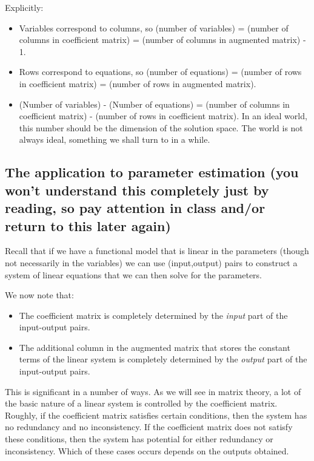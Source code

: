 \documentclass[10pt]{amsart}
\begin{document}
Explicitly:

\begin{itemize}
\item Variables correspond to columns, so (number of variables) =
  (number of columns in coefficient matrix) = (number of columns in
  augmented matrix) - 1.
\item Rows correspond to equations, so (number of equations) = (number
  of rows in coefficient matrix) = (number of rows in augmented
  matrix).
\item (Number of variables) - (Number of equations) = (number of
  columns in coefficient matrix) - (number of rows in coefficient
  matrix). In an ideal world, this number should be the dimension of
  the solution space. The world is not always ideal, something we
  shall turn to in a while.
\end{itemize}

\subsection{The application to parameter estimation (you won't understand this completely just by reading, so pay attention in class and/or return to this later again)}

Recall that if we have a functional model that is linear in the
parameters (though not necessarily in the variables) we can use
(input,output) pairs to construct a system of linear equations that we
can then solve for the parameters.

We now note that:

\begin{itemize}
\item The coefficient matrix is completely determined by the {\em
  input} part of the input-output pairs.
\item The additional column in the augmented matrix that stores the
  constant terms of the linear system is completely determined by the
  {\em output} part of the input-output pairs.
\end{itemize}

This is significant in a number of ways. As we will see in matrix
theory, a lot of the basic nature of a linear system is controlled by
the coefficient matrix. Roughly, if the coefficient matrix satisfies
certain conditions, then the system has no redundancy and no
inconsistency. If the coefficient matrix does not satisfy these
conditions, then the system has potential for either redundancy or
inconsistency. Which of these cases occurs depends on the outputs
obtained.
\end{document}

